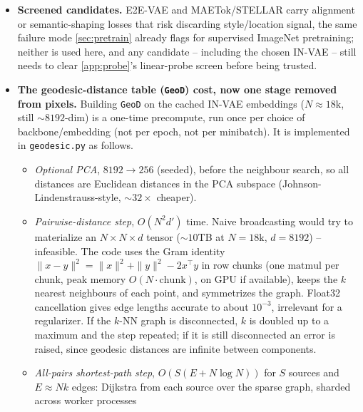 \begin{itemize}[leftmargin=1.5em]
      \texttt{ti\_dataset.py}) use $256\times256$ images and the matching bounding-box transform. The
      sections on , which assume $224$px, are not updated by this and refer to the
      ResNet-50 pipeline only.
\item \textbf{Screened candidates.} E2E-VAE and MAETok/STELLAR carry alignment or semantic-shaping losses
      that risk discarding style/location signal, the same failure mode \cref{sec:pretrain} already flags
      for supervised ImageNet pretraining; neither is used here, and any candidate -- including the chosen
      IN-VAE -- still needs to clear \cref{app:probe}'s linear-probe screen before being trusted.
\item \textbf{The geodesic-distance table (\texttt{GeoD}) cost, now one stage removed from pixels.} Building
      \texttt{GeoD} on the cached IN-VAE embeddings ($N\!\approx\!18\mathrm{k}$, still $\sim\!8192$-dim)
      is a one-time precompute, run once per choice of backbone/embedding (not per epoch, not per
      minibatch). It is implemented in \texttt{geodesic.py} as follows.
      \begin{itemize}[leftmargin=1.3em]
      \item \emph{Optional PCA}, $8192\to256$ (seeded), before the neighbour search, so all distances
            are Euclidean distances in the PCA subspace (Johnson-Lindenstrauss-style, $\sim\!32\times$
            cheaper).
      \item \emph{Pairwise-distance step}, $O(N^2d')$ time. Naive broadcasting would try to materialize an
            $N\times N\times d$ tensor ($\sim\!10$TB at $N=18\mathrm{k}$, $d=8192$) -- infeasible. The
            code uses the Gram identity $\|x-y\|^2=\|x\|^2+\|y\|^2-2x^\top y$ in row chunks (one 
            $\mathrm{matmul}$ per chunk, peak memory \linebreak
            $O(N \cdot \mathrm{chunk})$, on GPU if available), keeps the $k$ nearest
            neighbours of each point, and symmetrizes the graph. Float32 cancellation gives edge lengths
            accurate to about $10^{-3}$, irrelevant for a regularizer. If the $k$-NN graph is
            disconnected, $k$ is doubled up to a maximum and the step repeated; if it is still
            disconnected an error is raised, since geodesic distances are infinite between components.
      \item \emph{All-pairs shortest-path step}, $O(S(E+N\log N))$ for $S$ sources and $E\approx Nk$
            edges: Dijkstra from each source over the sparse graph, sharded across worker processes

\end{itemize}
\end{itemize}

